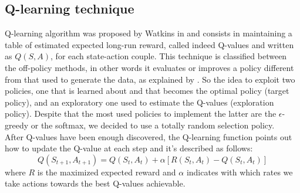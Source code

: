 \documentclass[conference,10pt]{IEEEtran}
\begin{document}
\subsection{Q-learning technique}
Q-learning algorithm was proposed by Watkins in \cite{watkins1992q} and consists in maintaining a table of estimated expected long-run reward, called indeed Q-values and written as $Q(S,A)  $, for each state-action couple. This technique is classified between the off-policy methods, in other words it evaluates or improves a policy different from that used to generate the data, as explained by \cite{sutton1998reinforcement}. So the idea to exploit two policies, one that is learned about and that becomes the optimal policy (target policy), and an exploratory one used to estimate the Q-values (exploration policy). Despite that the most used policies to implement the latter are the $\epsilon$-greedy or the softmax, we decided to use a totally random selection policy. \\
After Q-values have been enough discovered, the Q-learning function points out how to update the Q-value at each step and it's described as follows:
\begin{equation*}
Q(S_{t+1},A_{t+1})=Q(S_{t},A_{t})+\alpha[R(S_{t},A_{t})-Q(S_{t},A_{t})]
\end{equation*}
where $ R  $ is the maximized expected reward and $\alpha$ indicates with which rates we take actions towards the best Q-values achievable.
\end{document}
